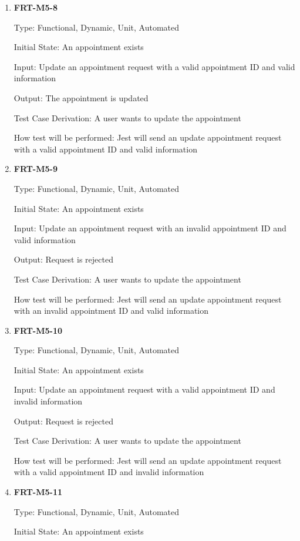 \documentclass[12pt, titlepage]{article}
\begin{document}
\begin{enumerate}
	\item \textbf{FRT-M5-8}

	      Type: Functional, Dynamic, Unit, Automated

	      Initial State: An appointment exists

	      Input: Update an appointment request with a valid appointment ID and valid information

	      Output: The appointment is updated

	      Test Case Derivation: A user wants to update the appointment

	      How test will be performed: Jest will send an update appointment request with a valid appointment
	      ID and valid information

	\item \textbf{FRT-M5-9}

	      Type: Functional, Dynamic, Unit, Automated

	      Initial State: An appointment exists

	      Input: Update an appointment request with an invalid appointment ID and valid information

	      Output: Request is rejected

	      Test Case Derivation: A user wants to update the appointment

	      How test will be performed: Jest will send an update appointment request with an invalid
	      appointment ID and valid information

	\item \textbf{FRT-M5-10}

	      Type: Functional, Dynamic, Unit, Automated

	      Initial State: An appointment exists

	      Input: Update an appointment request with a valid appointment ID and invalid information

	      Output: Request is rejected

	      Test Case Derivation: A user wants to update the appointment

	      How test will be performed: Jest will send an update appointment request with a valid appointment
	      ID and invalid information

	\item \textbf{FRT-M5-11}

	      Type: Functional, Dynamic, Unit, Automated

	      Initial State: An appointment exists


\end{enumerate}
\end{document}
